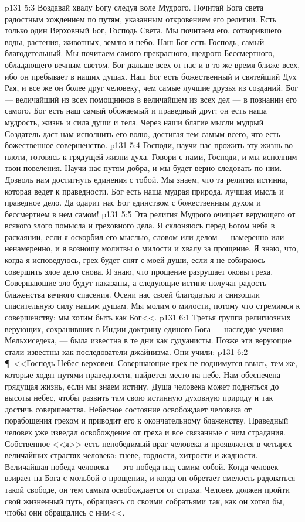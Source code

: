 \vs p131 5:3 Воздавай хвалу Богу следуя воле Мудрого. Почитай Бога света радостным хождением по путям, указанным откровением его религии. Есть только один Верховный Бог, Господь Света. Мы почитаем его, сотворившего воды, растения, животных, землю и небо. Наш Бог есть Господь, самый благодетельный. Мы почитаем самого прекрасного, щедрого Бессмертного, обладающего вечным светом. Бог дальше всех от нас и в то же время ближе всех, ибо он пребывает в наших душах. Наш Бог есть божественный и святейший Дух Рая, и все же он более друг человеку, чем самые лучшие друзья из созданий. Бог --- величайший из всех помощников в величайшем из всех дел --- в познании его самого. Бог есть наш самый обожаемый и праведный друг; он есть наша мудрость, жизнь и сила души и тела. Через наши благие мысли мудрый Создатель даст нам исполнить его волю, достигая тем самым всего, что есть божественное совершенство.
\vs p131 5:4 Господи, научи нас прожить эту жизнь во плоти, готовясь к грядущей жизни духа. Говори с нами, Господи, и мы исполним твои повеления. Научи нас путям добра, и мы будет верно следовать по ним. Дозволь нам достигнуть единения с тобой. Мы знаем, что та религия истинна, которая ведет к праведности. Бог есть наша мудрая природа, лучшая мысль и праведное дело. Да одарит нас Бог единством с божественным духом и бессмертием в нем самом!
\vs p131 5:5 Эта религия Мудрого очищает верующего от всякого злого помысла и греховного дела. Я склоняюсь перед Богом неба в раскаянии, если я оскорбил его мыслью, словом или делом --- намеренно или ненамеренно, и я возношу молитвы о милости и хвалу за прощение. Я знаю, что, когда я исповедуюсь, грех будет снят с моей души, если я не собираюсь совершить злое дело снова. Я знаю, что прощение разрушает оковы греха. Совершающие зло будут наказаны, а следующие истине получат радость блаженства вечного спасения. Осени нас своей благодатью и снизошли спасительную силу нашим душам. Мы молим о милости, потому что стремимся к совершенству; мы хотим быть как Бог<<.
\vs p131 6:1 Третья группа религиозных верующих, сохранивших в Индии доктрину единого Бога --- наследие учения Мельхиседека, --- была известна в те дни как судуанисты. Позже эти верующие стали известны как последователи джайнизма. Они учили:
\vs p131 6:2 \P\ <<Господь Небес верховен. Совершающие грех не поднимутся ввысь, тем же, которые ходят путями праведности, найдется место на небе. Нам обеспечена грядущая жизнь, если мы знаем истину. Душа человека может подняться до высоты небес, чтобы развить там свою истинную духовную природу и так достичь совершенства. Небесное состояние освобождает человека от порабощения грехом и приводит его к окончательному блаженству. Праведный человек уже изведал освобождение от греха и все связанные с ним страдания. Собственное <<я>> есть непобедимый враг человека и проявляется в четырех величайших страстях человека: гневе, гордости, хитрости и жадности. Величайшая победа человека --- это победа над самим собой. Когда человек взирает на Бога с мольбой о прощении, и когда он обретает смелость радоваться такой свободе, он тем самым освобождается от страха. Человек должен пройти свой жизненный путь, обращаясь со своими собратьями так, как он хотел бы, чтобы они обращались с ним<<.
